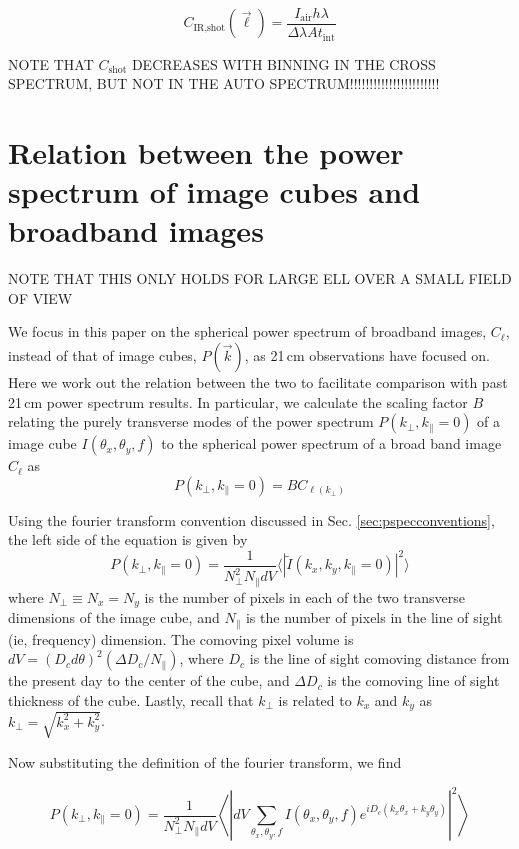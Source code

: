\documentclass[preprint]{aastex}
\newcommand{\IR}{\text{IR}}
\newcommand{\shot}{\text{shot}}
\begin{document}
\begin{equation}
C_{\IR, \shot}(\vec{\ell}) =\frac{I_\text{air}h\lambda}{\Delta \lambda A t_\text{int}}
\end{equation}

NOTE THAT $C_\shot$ DECREASES WITH BINNING IN THE CROSS SPECTRUM, BUT NOT IN THE AUTO SPECTRUM!!!!!!!!!!!!!!!!!!!!!!!

\section{Relation between the power spectrum of image cubes and broadband images}
\label{sec:pspecrelation}

NOTE THAT THIS ONLY HOLDS FOR LARGE ELL OVER A SMALL FIELD OF VIEW

We focus in this paper on the spherical power spectrum of broadband images, $C_\ell$,  instead of that of image cubes, $P(\vec{k})$, as 21\,cm observations have focused on. Here we work out the relation between the two to facilitate comparison with past 21\,cm power spectrum results. In particular, we calculate the scaling factor $B$ relating the purely transverse modes of the power spectrum $P(k_\perp,k_\parallel=0)$ of a image cube $I(\theta_x,\theta_y,f)$ to the spherical power spectrum of a broad band image $C_\ell$ as
\begin{equation}
P(k_\perp,k_\parallel=0) = B C_{\ell(k_\perp)}
\end{equation}

Using the fourier transform convention discussed in Sec. \ref{sec:pspecconventions}, the left side of the equation is given by
\begin{equation}
P(k_\perp,k_\parallel=0) = \frac{1}{N_\perp^2 N_\parallel dV}\langle|\tilde{I}(k_x,k_y,k_\parallel=0)|^2\rangle
\end{equation}
where $N_\perp\equiv N_x=N_y$ is the number of pixels in each of the two transverse dimensions of the image cube, and $N_\parallel$ is the number of pixels in the line of sight (ie, frequency) dimension. The comoving pixel volume is $dV = (D_c d\theta)^2 (\Delta D_c/N_\parallel)$, where $D_c$ is the line of sight comoving distance from the present day to the center of the cube, and $\Delta D_c$ is the comoving line of sight thickness of the cube. Lastly, recall that $k_\perp$ is related to $k_x$ and $k_y$ as $k_\perp=\sqrt{k_x^2+k_y^2}$.

Now substituting the definition of the fourier transform, we find

\begin{equation}
P(k_\perp,k_\parallel=0) =\frac{1}{N_\perp^2 N_\parallel dV}\left\langle\left|dV\sum_{\theta_x,\theta_y,f}I(\theta_x,\theta_y,f)e^{iD_c(k_x\theta_x+k_y\theta_y)}\right|^2\right\rangle
\end{equation}
\end{document}
